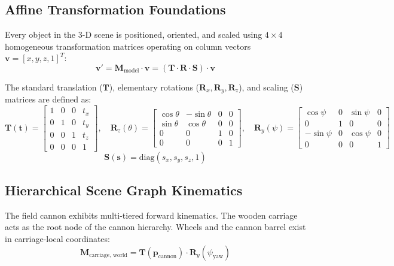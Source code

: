 \documentclass[11pt,a4paper]{article}
\begin{document}
\subsection{Affine Transformation Foundations}
Every object in the 3-D scene is positioned, oriented, and scaled using $4 \times 4$ homogeneous transformation matrices operating on column vectors $\mathbf{v} = [x, y, z, 1]^T$:
\begin{equation}
  \mathbf{v}' = \mathbf{M}_{\text{model}} \cdot \mathbf{v} = (\mathbf{T} \cdot \mathbf{R} \cdot \mathbf{S}) \cdot \mathbf{v}
\end{equation}

The standard translation ($\mathbf{T}$), elementary rotations ($\mathbf{R}_x, \mathbf{R}_y, \mathbf{R}_z$), and scaling ($\mathbf{S}$) matrices are defined as:
\begin{equation}
  \mathbf{T}(\mathbf{t}) = \begin{bmatrix}
    1 & 0 & 0 & t_x \\
    0 & 1 & 0 & t_y \\
    0 & 0 & 1 & t_z \\
    0 & 0 & 0 & 1
  \end{bmatrix}, \quad
  \mathbf{R}_z(\theta) = \begin{bmatrix}
    \cos\theta & -\sin\theta & 0 & 0 \\
    \sin\theta & \cos\theta & 0 & 0 \\
    0 & 0 & 1 & 0 \\
    0 & 0 & 0 & 1
  \end{bmatrix}, \quad
  \mathbf{R}_y(\psi) = \begin{bmatrix}
    \cos\psi & 0 & \sin\psi & 0 \\
    0 & 1 & 0 & 0 \\
    -\sin\psi & 0 & \cos\psi & 0 \\
    0 & 0 & 0 & 1
  \end{bmatrix}
\end{equation}
\begin{equation}
  \mathbf{S}(\mathbf{s}) = \text{diag}(s_x, s_y, s_z, 1)
\end{equation}

\subsection{Hierarchical Scene Graph Kinematics}
The field cannon exhibits multi-tiered forward kinematics. The wooden carriage acts as the root node of the cannon hierarchy. Wheels and the cannon barrel exist in carriage-local coordinates:
\begin{equation}
  \mathbf{M}_{\text{carriage, world}} = \mathbf{T}(\mathbf{p}_{\text{cannon}}) \cdot \mathbf{R}_y(\psi_{\text{yaw}})
\end{equation}
\end{document}
